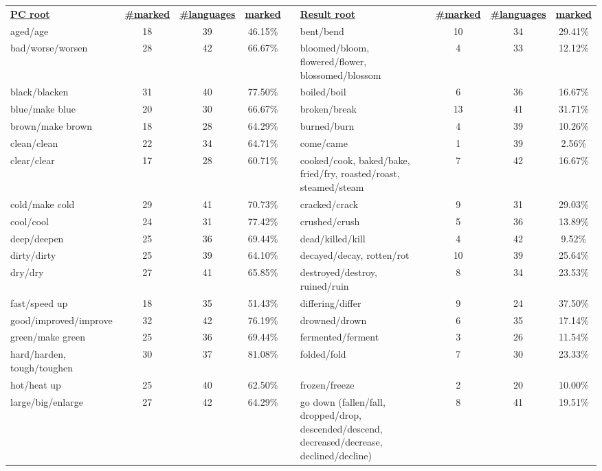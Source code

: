 \begin{tabular}{p{3cm}ccccp{3cm}ccc}
\underline{\textbf{PC root}} & \underline{\textbf{\#marked}} & \underline{\textbf{\#languages}} & \underline{\textbf{marked}} & & \underline{\textbf{Result root}} & \underline{\textbf{\#marked}} & \underline{\textbf{\#languages}} & \underline{\textbf{marked}} \\
aged/age & 18 & 39 & 46.15\% & & bent/bend & 10 & 34 & 29.41\% \\
bad/worse/worsen & 28 & 42 & 66.67\% & & bloomed/bloom, flowered/flower, blossomed/blossom & 4 & 33 & 12.12\% \\
black/blacken & 31 & 40 & 77.50\% & & boiled/boil & 6 & 36 & 16.67\% \\
blue/make blue & 20 & 30 & 66.67\% & & broken/break & 13 & 41 & 31.71\% \\
brown/make brown & 18 & 28 & 64.29\% & & burned/burn & 4 & 39 & 10.26\% \\
clean/clean & 22 & 34 & 64.71\% & & come/came & 1 & 39 & 2.56\% \\
clear/clear & 17 & 28 & 60.71\% & & cooked/cook, baked/bake, fried/fry, roasted/roast, steamed/steam & 7 & 42 & 16.67\% \\
cold/make cold & 29 & 41 & 70.73\% & & cracked/crack & 9 & 31 & 29.03\% \\
cool/cool & 24 & 31 & 77.42\% & & crushed/crush & 5 & 36 & 13.89\% \\
deep/deepen & 25 & 36 & 69.44\% & & dead/killed/kill & 4 & 42 & 9.52\% \\
dirty/dirty & 25 & 39 & 64.10\% & & decayed/decay, rotten/rot & 10 & 39 & 25.64\% \\
dry/dry & 27 & 41 & 65.85\% & & destroyed/destroy, ruined/ruin & 8 & 34 & 23.53\% \\
fast/speed up & 18 & 35 & 51.43\% & & differing/differ & 9 & 24 & 37.50\% \\
good/improved/improve & 32 & 42 & 76.19\% & & drowned/drown & 6 & 35 & 17.14\% \\
green/make green & 25 & 36 & 69.44\% & & fermented/ferment & 3 & 26 & 11.54\% \\
hard/harden, tough/toughen & 30 & 37 & 81.08\% & & folded/fold & 7 & 30 & 23.33\% \\
hot/heat up & 25 & 40 & 62.50\% & & frozen/freeze & 2 & 20 & 10.00\% \\
large/big/enlarge & 27 & 42 & 64.29\% & & go down (fallen/fall, dropped/drop, descended/descend, decreased/decrease, declined/decline) & 8 & 41 & 19.51\% \\

\end{tabular}
